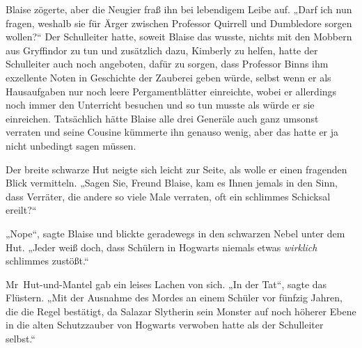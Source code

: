 Blaise zögerte, aber die Neugier fraß ihn bei lebendigem Leibe auf.
„Darf ich nun fragen, weshalb sie für Ärger zwischen Professor Quirrell und Dumbledore sorgen wollen?“ Der Schulleiter hatte, soweit Blaise das wusste, nichts mit den Mobbern aus Gryffindor zu tun und zusätzlich dazu, Kimberly zu helfen, hatte der Schulleiter auch noch angeboten, dafür zu sorgen, dass Professor Binns ihm exzellente Noten in Geschichte der Zauberei geben würde, selbst wenn er als Hausaufgaben nur noch leere Pergamentblätter einreichte, wobei er allerdings noch immer den Unterricht besuchen und so tun musste als würde er sie einreichen. Tatsächlich hätte Blaise alle drei Generäle auch ganz umsonst verraten und seine Cousine kümmerte ihn genauso wenig, aber das hatte er ja nicht unbedingt sagen müssen.

Der breite schwarze Hut neigte sich leicht zur Seite, als wolle er einen fragenden Blick vermitteln.
„Sagen Sie, Freund Blaise, kam es Ihnen jemals in den Sinn, dass Verräter, die andere so viele Male verraten, oft ein schlimmes Schicksal ereilt?“

„Nope“, sagte Blaise und blickte geradewegs in den schwarzen Nebel unter dem Hut.
„Jeder weiß doch, dass Schülern in Hogwarts niemals etwas \emph{wirklich} schlimmes zustößt.“

Mr~Hut-und-Mantel gab ein leises Lachen von sich.
„In der Tat“, sagte das Flüstern.
„Mit der Ausnahme des Mordes an einem Schüler vor fünfzig Jahren, die die Regel bestätigt, da Salazar Slytherin sein Monster auf noch höherer Ebene in die alten Schutzzauber von Hogwarts verwoben hatte als der Schulleiter selbst.“

